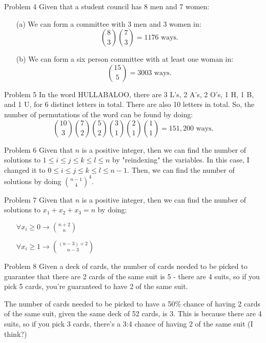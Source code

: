 \documentclass[12pt]{article}
\begin{document}
    \begin{problem}{Problem 4}
        Given that a student council has 8 men and 7 women:
        \begin{itemize}
            \item[(a)] We can form a committee with 3 men and 3 women in: \[\binom{8}{3} \binom{7}{3} = 1176 \text{ ways.}\]
            \item[(b)] We can form a six person committee with at least one woman in: \[\binom{15}{5} = 3003 \text{ ways.}\]
        \end{itemize}
    \end{problem}

    \begin{problem}{Problem 5}
        In the word HULLABALOO, there are 3 L's, 2 A's, 2 O's, 1 H, 1 B, and 1 U, for 6 distinct letters in total.
        There are also 10 letters in total. So, the number of permutations of the word can be found by doing:
        \[\binom{10}{3} \binom{7}{2} \binom{5}{2} \binom{3}{1} \binom{2}{1} \binom{1}{1} = 151,200 \text{ ways.}\]
    \end{problem}

    \begin{problem}{Problem 6}
        Given that $n$ is a positive integer, then we can find the number of solutions to $1 \leq i \leq j \leq k \leq l \leq n$ by
        "reindexing" the variables. In this case, I changed it to $0 \leq i \leq j \leq k \leq l \leq n-1$. Then, we can find the number
        of solutions by doing $\binom{n-1}{4}^4$.
    \end{problem}

    \begin{problem}{Problem 7}
        Given that $n$ is a positive integer, then we can find the number of solutions to $x_1 + x_2 + x_3 = n$ by doing:
        \begin{itemize}
            \item[] $\forall x_i \geq 0 \rightarrow \binom{n+2}{n}$
            \item[] $\forall x_i \geq 1 \rightarrow \binom{(n - 3) + 2}{n - 3}$
        \end{itemize}
    \end{problem}

    \begin{problem}{Problem 8}
        Given a deck of cards, the number of cards needed to be picked to guarantee that there are 2 cards of the same suit
        is 5 - there are 4 suits, so if you pick 5 cards, you're guaranteed to have 2 of the same suit.

        The number of cards needed to be picked to have a 50\% chance of having 2 cards of the same suit, given the same deck
        of 52 cards, is 3. This is because there are 4 suits, so if you pick 3 cards, there's a 3:4 chance of having 2 of the
        same suit (I think?)
    \end{problem}
\end{document}
